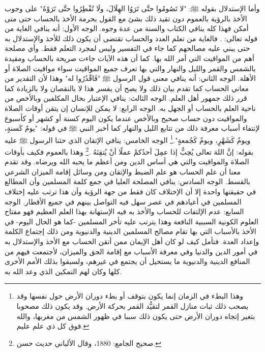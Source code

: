 وأما الإستدلال بقوله ﷺ: "لا تَصُومُوا حتَّى تَرَوُا الهِلَالَ، ولَا تُفْطِرُوا حتَّى تَرَوْهُ" على وجوب الأخذ بالرؤية بالعموم دون تقيد ذلك بشئ مع القول بحرمة الأخذ بالحساب حتى متى أمكن فهذا كله ينافي الكتاب والسنة من عدة وجوه. الوجه الأول: أنه ينافي الغاية من قوله تعالى: \quranayah*[10][5] {\footnotesize (\surahname*[10])}. فالغاية من تعلم العدد والحساب تقتضى أن يكون ذلك للأخذ والإستدلال به حتى يبني عليه مصالحهم كما جاء في التفسير وليس لمجرد التعلم فقط. وأي مصلحة أهم من المواقيت التي أمر الله بها. كما أن هذه الآيات جاءت صريحة  بالحساب ومقيدة بالشمس والقمر والليل والنهار والتي بها تعرف جميع المواقيت سواء مواقيت الصلاة أو الأهلة. الوجه الثاني: أنه ينافي معنى قول الرسول ﷺ "فَاقْدُرُوا له" وهذا لأن التقدير من معاني الحساب كما تقدم بيان ذلك ولا يصح أن يفسر هذا لا بالنقصان ولا بالزيادة كما قرر ذلك جمهور أهل العلم. الوجه الثالث: ينافي الإعتبار بحال المكلفين وبالأخص من ناحية العلم بالحساب أو الجهل به. الوجه الرابع: لا يمكن للإنسان إن يتقن أوقات الصلاة والمواقيت دون حساب صحيح وبالأخص عندما يكون اليوم كسنة أو كشهر أو كأسبوع لإنتفاء أسباب معرفة ذلك من تتابع الليل والنهار كما أخبر النبي ﷺ في قوله: "يومٌ كَسنةٍ، ويومٌ كَشَهْرٍ، ويومٌ كَجُمعةٍ".\footnote{وهذا البطء في الزمان إنما يكون بتوقف أو بطء دوران الأرض حول نفسها وقد يصحب ذلك ثبات منازل القمر لتقيُّد القمر بحركة الأرض. وقد يكون ذلك مصحوبا بتغير إتجاه دوران الأرض حتى يكون ذلك سببا في ظهور الشمس من مغربها، والله فوق كل ذي علم عليم.} الوجه الخامس: ينافي الإتقان الذي حثنا الرسول ﷺ عليه بقوله: إنَّ اللهَ تعالى يُحِبُّ إذا عمِلَ أحدُكمْ عملًا أنْ يُتقِنَهُ \href{https://shamela.ws/book/21659/2761#p1}{\faExternalLink} \cite{jamaaSagheer}.\footnote{صحيح الجامع: 1880، وقال الألباني حديث حسن.} وهذا بالعموم فكيف بأوقات الصلاة والمواقيت والتي هي أساس الدين ومن أعظم ما يحبه الله ويرضاه. وقد تقدم معنا أن علم الحساب هو علم الضبط والإتقان ومن وسائل إقامة الميزان الشرعي بالقسط. الوجه السادس: ينافي المصلحة العليا في جمع كلمة المسلمين وأن المطالع في حقيقتها واحدة إلا أن الإختلاف كان فقط من جهة الرؤية وأن هذا ترتب عليه إختلاف المسلمين في أعيادهم في عصر سهل فيه التواصل بينهم في جميع الأقطار. الوجه السابع: عدم الإلتفات للحساب والأخذ به فيه الإستهانة بهذا العلم العظيم فهو مفتاح العلوم الكونية السببية النافعة وهذا يترتب عليه تأخر المسلمين -كما هو الحال اليوم- في الأخذ بالأسباب التي بها تقام مصالح المسلمين الدينية والدنيوية ومن ذلك إجتماع الكلمة وإعداد العدة. فتأمل كيف لو كان أهل الإيمان ممن أتقن الحساب مع الأخذ والإستدلال به في أمور الدين والدنيا وفي معرفة الأسباب مع إقامة الحق والميزان، لأجتمعت فيهم من المنافع الدينية والدنيوية ما يستحيل أن يجتمع في غيرهم، ولسبقوا بذلك الأمم الأخرى كلها وكان لهم التمكين الذي وعد الله به.

